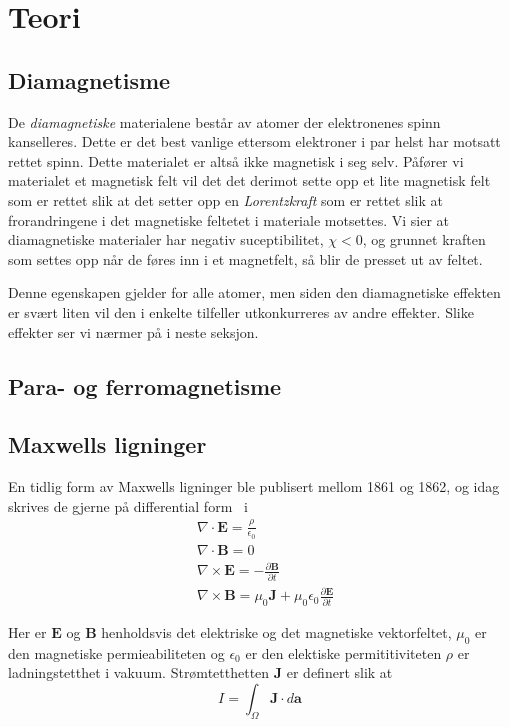 \documentclass[a4paper,11pt, twocolumn]{article}
\begin{document}

\section{Teori}
\subsection{Diamagnetisme}
De \textit{diamagnetiske} materialene består av atomer der elektronenes spinn kanselleres. Dette er det best vanlige ettersom elektroner i par helst har motsatt rettet spinn. Dette materialet er altså ikke magnetisk i seg selv. Påfører vi materialet et magnetisk felt vil det det derimot sette opp et lite magnetisk felt som er rettet slik at det setter opp en \textit{Lorentzkraft} som er rettet slik at frorandringene i det magnetiske feltetet i materiale motsettes. Vi sier at diamagnetiske materialer har negativ suceptibilitet, $\chi <0$, og grunnet kraften som settes opp når de føres inn i et magnetfelt, så blir de presset ut av feltet.

Denne egenskapen gjelder for alle atomer, men siden den diamagnetiske effekten er svært liten vil den i enkelte tilfeller utkonkurreres av andre effekter. Slike effekter ser vi nærmer på i neste seksjon.

\subsection{Para- og ferromagnetisme}

\subsection{Maxwells ligninger}
En tidlig form av Maxwells ligninger ble publisert mellom 1861 og 1862, og idag skrives de gjerne på differential form~\cite[kap. 9.3.3]{griffithsED}
i
\begin{align}
	&\nabla\cdot\mathbf{E}= \frac{\rho}{\epsilon_0}
	\label{eq:max1}\\
	&\nabla\cdot\mathbf{B} = 0
	\label{eq:max2}\\
	&\nabla\times\mathbf{E} = -\frac{\partial \mathbf{B}}{\partial t}
	\label{eq:max3}\\
	&\nabla\times\mathbf{B} = \mu_0\mathbf{J}+\mu_0\epsilon_0\frac{\partial\mathbf{E}}{\partial t}
	\label{eq:max4}
\end{align}

Her er $\mathbf{E}$ og $\mathbf{B}$ henholdsvis det elektriske og det magnetiske vektorfeltet, $\mu_0$ er den magnetiske permieabiliteten og $\epsilon_0$ er den elektiske permititiviteten $\rho$ er ladningstetthet i vakuum. Strømtetthetten $\mathbf{J}$ er definert slik at 
\begin{equation}
	I = \int_\Omega \mathbf{J}\cdot d\mathbf{a}
	\label{eq:currentDensity}
\end{equation}
\end{document}
